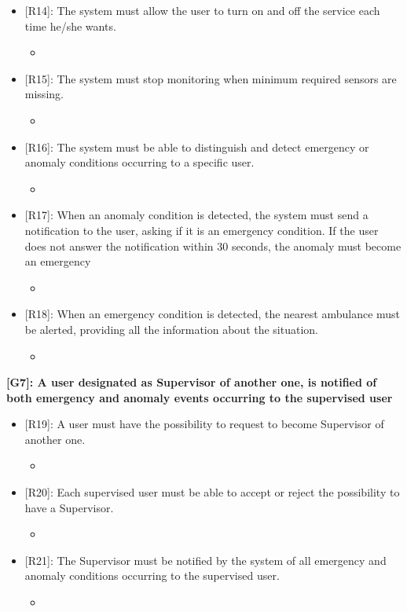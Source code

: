 \begin{itemize}
	\item {[R14]: The system must allow the user to turn on and off the service each time he/she wants.}
	\begin{itemize}
		\item {}
	\end{itemize}   
	\item {[R15]: The system must stop monitoring when minimum required sensors are missing.}
	\begin{itemize}
		\item {}
	\end{itemize}   
	\item {[R16]: The system must be able to distinguish and detect emergency or anomaly conditions occurring to a specific user.}
	\begin{itemize}
		\item {}
	\end{itemize}   
	\item {[R17]: When an anomaly condition is detected, the system must send a notification to the user, asking if it is an emergency condition. If the user does not answer the notification within 30 seconds, the anomaly must become an emergency }
	\begin{itemize}
		\item {}
	\end{itemize}   
	\item {[R18]: When an emergency condition is detected, the nearest ambulance must be alerted, providing all the information about the situation.}
	\begin{itemize}
		\item {}
	\end{itemize}   
	
\end{itemize}
\raggedbottom
\textbf{[G7]: A user designated as Supervisor of another one, is notified of both emergency and anomaly events occurring to the supervised user}

\begin{itemize}[itemsep=0em]
	\item {[R19]: A user must have the possibility to request to become Supervisor of another one.}
	\begin{itemize}
		\item {}
	\end{itemize}   
	\item {[R20]: Each supervised user must be able to accept or reject the possibility to have a Supervisor.}
	\begin{itemize}
		\item {}
	\end{itemize}   
	\item {[R21]: The Supervisor must be notified by the system of all emergency and anomaly conditions occurring to the supervised user.}
	\begin{itemize}
		\item {}
	\end{itemize}   
	
\end{itemize}


